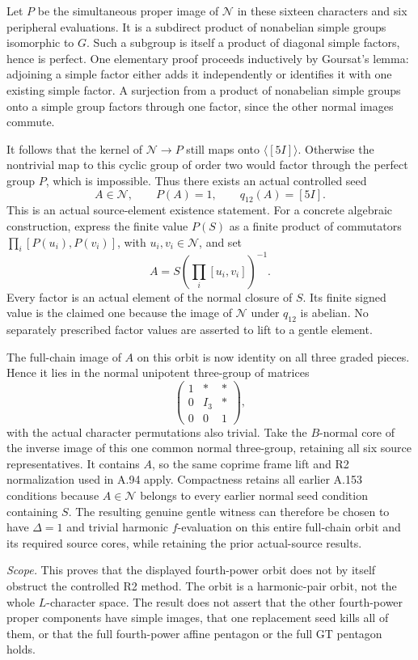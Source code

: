 Let $P$ be the simultaneous proper image of
$\mathcal N$ in these sixteen characters and six
peripheral evaluations.  It is a subdirect product
of nonabelian simple groups isomorphic to $G$.
Such a subgroup is itself a product of diagonal
simple factors, hence is perfect.  One elementary
proof proceeds inductively by Goursat's lemma:
adjoining a simple factor either adds it independently
or identifies it with one existing simple factor.
A surjection from a product of nonabelian simple
groups onto a simple group factors through one
factor, since the other normal images commute.

It follows that the kernel of
$\mathcal N\to P$ still maps onto
$\langle[5I]\rangle$.  Otherwise the nontrivial
map to this cyclic group of order two would factor
through the perfect group $P$, which is impossible.
Thus there exists an actual controlled seed
\[
 A\in\mathcal N,\qquad P(A)=1,
 \qquad q_{12}(A)=[5I].
\]
This is an actual source-element existence statement.
For a concrete algebraic construction, express the
finite value $P(S)$ as a finite product of commutators
$\prod_i[P(u_i),P(v_i)]$, with $u_i,v_i\in\mathcal N$,
and set
\[
                A=S\left(\prod_i[u_i,v_i]\right)^{-1}.
\]
Every factor is an actual element of the normal closure
of $S$.  Its finite signed value is the claimed one
because the image of $\mathcal N$ under $q_{12}$ is
abelian.  No separately prescribed factor values are
asserted to lift to a gentle element.

The full-chain image of $A$ on this orbit is now
identity on all three graded pieces.  Hence it lies
in the normal unipotent three-group of matrices
\[
 \begin{pmatrix}
  1&*&*\\0&I_3&*\\0&0&1
 \end{pmatrix},
\]
with the actual character permutations also trivial.
Take the $B$-normal core of the inverse image of this
one common normal three-group, retaining all six
source representatives.  It contains $A$, so the
same coprime frame lift and R2 normalization used in
A.94 apply.  Compactness retains all earlier A.153
conditions because $A\in\mathcal N$ belongs to every
earlier normal seed condition containing $S$.
The resulting genuine gentle witness can therefore
be chosen to have $\Delta=1$ and trivial harmonic
$f$-evaluation on this entire full-chain orbit and
its required source cores, while retaining the prior
actual-source results.

\emph{Scope.}  This proves that the displayed
fourth-power orbit does not by itself obstruct the
controlled R2 method.  The orbit is a harmonic-pair
orbit, not the whole $L$-character space.  The result
does not assert that the other fourth-power proper
components have simple images, that one replacement
seed kills all of them, or that the full fourth-power
affine pentagon or the full GT pentagon holds.

